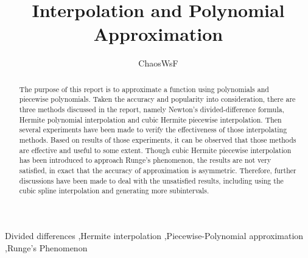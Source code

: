 \documentclass[preprint,12pt]{elsarticle}
\begin{document}
\begin{frontmatter}


\title{Interpolation and Polynomial Approximation}




\author{ChaosWsF}

\address{No.0, X University}

\begin{abstract}
The purpose of this report is to approximate a function using polynomials and piecewise polynomials. Taken the accuracy and popularity into consideration, there are three methods discussed in the report, namely Newton's divided-difference formula, Hermite polynomial interpolation and cubic Hermite piecewise interpolation. Then several experiments have been made to verify the effectiveness of those interpolating methods. Based on results of those experiments, it can be observed that those methods are effective and useful to some extent. Though cubic Hermite piecewise interpolation has been introduced to approach Runge's phenomenon, the results are not very satisfied, in exact that the accuracy of approximation is asymmetric. Therefore, further discussions have been made to deal with the unsatisfied results, including using the cubic spline interpolation and generating more subintervals.
\end{abstract}

\begin{keyword}
Divided differences \sep Hermite interpolation \sep Piecewise-Polynomial approximation \sep Runge's Phenomenon


\end{keyword}

\end{frontmatter}
\end{document}

